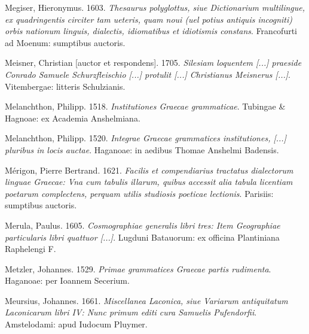 \begin{styleStandard}
Megiser, Hieronymus. 1603. \textit{Thesaurus polyglottus, siue Dictionarium multilingue, ex quadringentis circiter tam ueteris, quam noui (uel potius antiquis incogniti) orbis nationum linguis, dialectis, idiomatibus et idiotismis constans}. Francofurti ad Moenum: sumptibus auctoris.
\end{styleStandard}

\begin{styleStandard}
Meisner, Christian [auctor et respondens]. 1705. \textit{Silesiam loquentem [...] praeside Conrado Samuele Schurzfleischio [...] protulit [...] Christianus Meisnerus [...]}. Vitembergae: litteris Schulzianis.
\end{styleStandard}

\begin{styleStandard}
Melanchthon, Philipp. 1518. \textit{Institutiones Graecae grammaticae}. Tubingae \& Hagnoae: ex Academia Anshelmiana.
\end{styleStandard}

\begin{styleStandard}
Melanchthon, Philipp. 1520. \textit{Integrae Graecae grammatices institutiones, [...] pluribus in locis auctae}. Haganoae: in aedibus Thomae Anshelmi Badensis.
\end{styleStandard}

\begin{styleStandard}
Mérigon, Pierre Bertrand. 1621. \textit{Facilis et compendiarius tractatus dialectorum linguae Graecae: Vna cum tabulis illarum, quibus accessit alia tabula licentiam poetarum complectens, perquam utilis studiosis poeticae lectionis}. Parisiis: sumptibus auctoris.
\end{styleStandard}

\begin{styleStandard}
Merula, Paulus. 1605. \textit{Cosmographiae generalis libri tres: Item Geographiae particularis libri quattuor [...]}. Lugduni Batauorum: ex officina Plantiniana Raphelengi F.
\end{styleStandard}

\begin{styleStandard}
Metzler, Johannes. 1529. \textit{Primae grammatices Graecae partis rudimenta}. Haganoae: per Ioannem Secerium.
\end{styleStandard}

\begin{styleStandard}
Meursius, Johannes. 1661. \textit{Miscellanea Laconica, siue Variarum antiquitatum Laconicarum libri IV: Nunc primum editi cura Samuelis Pufendorfii}. Amstelodami: apud Iudocum Pluymer.
\end{styleStandard}

